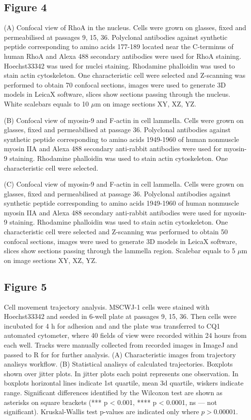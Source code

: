 \documentclass[alpha-refs]{wiley-article}
\begin{document}
\subsection*{Figure 4}
(A) Confocal view of RhoA in the nucleus.
Cells were grown on glasses, fixed and permeabilised at passages 9, 15, 36.
Polyclonal antibodies against synthetic peptide corresponding to amino acids 177-189 located near the C-terminus of human RhoA and Alexa 488 secondary antibodies were used for RhoA staining.
Hoechst33342 was used for nuclei staining.
Rhodamine phalloidin was used to stain actin cytoskeleton.
One characteristic cell were selected and Z-scanning was performed to obtain 70 confocal sections, images were used to generate 3D models in LeicaX software, slices show sections passing through the nucleus.
White scalebars equals to 10 $\mu$m on image sections XY, XZ, YZ.

(B) Confocal view of myosin-9 and F-actin in cell lammella.
Cells were grown on glasses, fixed and permeabilised at passage 36.
Polyclonal antibodies against synthetic peptide corresponding to amino acids 1949-1960 of human nonmuscle myosin IIA and Alexa 488 secondary anti-rabbit antibodies were used for myosin-9 staining.
Rhodamine phalloidin was used to stain actin cytoskeleton.
One characteristic cell were selected.

(C) Confocal view of myosin-9 and F-actin in cell lammella.
Cells were grown on glasses, fixed and permeabilised at passage 36.
Polyclonal antibodies against synthetic peptide corresponding to amino acids 1949-1960 of human nonmuscle myosin IIA and Alexa 488 secondary anti-rabbit antibodies were used for myosin-9 staining.
Rhodamine phalloidin was used to stain actin cytoskeleton.
One characteristic cell were selected and Z-scanning was performed to obtain 50 confocal sections, images were used to generate 3D models in LeicaX software, slices show sections passing through the lammella region.
Scalebar equals to 5 $\mu$m on image sections XY, XZ, YZ.


\subsection*{Figure 5}
Cell movement trajectory analysis.
MSCWJ-1 cells were stained with Hoechst33342 and seeded in 6-well plate at passages 9, 15, 36.
Then cells were incubated for 4 h for adhesion and and the plate was transferred to CQ1 automated cytometer, where 40 fields of view were recorded within 24 hours from each well.
Tracks were manually collected from recorded images in ImageJ and passed to R for for further analysis.
(A) Characteristic images from trajectory analisys workflow.
(B) Statistical analisys of calculated trajectories.
Boxplots shown over jitter plots.
In jitter plots each point represents one observation.
In boxplots horizontal lines indicate 1st quartile, mean 3d quartile, wiskers indicate range.
Significant differences identified by the Wilcoxon test are shown as asterisks on square brackets (*** p < 0.001, **** p < 0.0001, ns --- not significant).
Kruskal-Wallis test p-values are indicated only where $p > 0.00001$.
\end{document}
